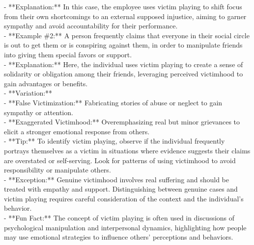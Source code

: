 \documentclass[a4paper,12pt,single,pdftex]{scrbook}
\begin{document}
    
      - **Explanation:** In this case, the employee uses victim playing to shift focus from their own shortcomings to an external supposed injustice, aiming to garner sympathy and avoid accountability for their performance.
    \\

    
      - **Example \#2:** A person frequently claims that everyone in their social circle is out to get them or is conspiring against them, in order to manipulate friends into giving them special favors or support.
    \\

    
      - **Explanation:** Here, the individual uses victim playing to create a sense of solidarity or obligation among their friends, leveraging perceived victimhood to gain advantages or benefits.
    \\

    
      - **Variation:**
    \\

    
        - **False Victimization:** Fabricating stories of abuse or neglect to gain sympathy or attention.
    \\

    
        - **Exaggerated Victimhood:** Overemphasizing real but minor grievances to elicit a stronger emotional response from others.
    \\

    
      - **Tip:** To identify victim playing, observe if the individual frequently portrays themselves as a victim in situations where evidence suggests their claims are overstated or self-serving. Look for patterns of using victimhood to avoid responsibility or manipulate others.
    \\

    
      - **Exception:** Genuine victimhood involves real suffering and should be treated with empathy and support. Distinguishing between genuine cases and victim playing requires careful consideration of the context and the individual's behavior.
    \\

    
      - **Fun Fact:** The concept of victim playing is often used in discussions of psychological manipulation and interpersonal dynamics, highlighting how people may use emotional strategies to influence others' perceptions and behaviors.
    \\

  
\end{document}
